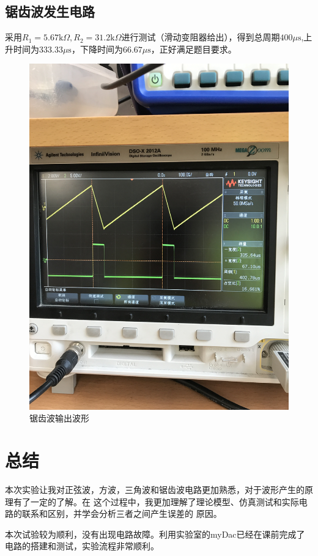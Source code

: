 \documentclass[UTF8,a4paper]{paper}
\begin{document}
\begin{multicols}{2}
\subsection{锯齿波发生电路}
采用$R_1=5.67\mathrm{k}\Omega,R_2=31.2\mathrm{k}\Omega$进行测试（滑动变阻器给出），得到总周期$400\mu\mathrm{s}$,上升时间为$333.33\mu\mathrm{s}$，下降时间为$66.67\mu\mathrm{s}$，正好满足题目要求。
\begin{figure}[H]
\centering
\includegraphics[width=\columnwidth,angle=-90]{wave/IMG_0659.jpg}
\caption{锯齿波输出波形}
\label{5}
\end{figure}
\end{multicols}
\section{总结}
本次实验让我对正弦波，方波，三角波和锯齿波电路更加熟悉，对于波形产生的原理有了一定的了解。在
这个过程中，我更加理解了理论模型、仿真测试和实际电路的联系和区别，并学会分析三者之间产生误差的
原因。

本次试验较为顺利，没有出现电路故障。利用实验室的myDac已经在课前完成了电路的搭建和测试，实验流程非常顺利。
\end{document}
